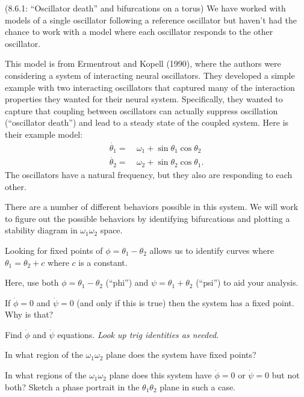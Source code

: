 \documentclass[12pt,letterpaper,noanswers]{exam}
\begin{document}
\begin{questions}

\question (8.6.1: ``Oscillator death'' and bifurcations on a torus)  We have worked with models of a single oscillator following a reference oscillator but haven't had the chance to work with a model where each oscillator responds to the other oscillator.

This model is from Ermentrout and Kopell (1990), where the authors were considering a system of interacting neural oscillators.  They developed a simple example with two interacting oscillators that captured many of the interaction properties they wanted for their neural system.  Specifically, they wanted to capture that coupling between oscillators can actually suppress oscillation (``oscillator death'') and lead to a steady state of the coupled system.  Here is their example model:
\begin{align*}
\dot{\theta_1} = &\ \omega_1 + \sin \theta_1 \cos\theta_2 \\
\dot{\theta_2} = &\ \omega_2 + \sin \theta_2 \cos\theta_1.
\end{align*}
The oscillators have a natural frequency, but they also are responding to each other.

There are a number of different behaviors possible in this system.
We will work to figure out the possible behaviors by identifying bifurcations and  plotting a stability diagram in $\omega_1\omega_2$ space.

\begin{parts}
\item Looking for fixed points of $\phi = \theta_1-\theta_2$ allows us to identify curves where $\theta_1 = \theta_2 + c$ where $c$ is a constant. 

Here, use both $\phi = \theta_1 - \theta_2$ (``phi'') and $\psi = \theta_1 + \theta_2$ (``psi'') to aid your analysis.  

If $\dot{\phi} = 0$ and $\dot{\psi} = 0$ (and only if this is true) then the system has a fixed point.  Why is that?
\item Find $\dot{\phi}$ and $\dot{\psi}$ equations.  \emph{Look up trig identities as needed.}
\item In what region of the $\omega_1\omega_2$ plane does the system have fixed points?
\item In what regions of the $\omega_1\omega_2$ plane does this system have $\dot{\phi} = 0$ or $\dot{\psi} = 0$ but not both?  Sketch a phase portrait in the $\theta_1\theta_2$ plane in such a case.
\end{parts} 


\end{questions}
\end{document}
